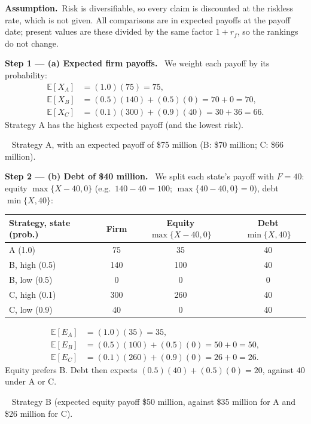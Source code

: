 \documentclass[11pt,a4paper]{article}
\newcommand{\step}[2]{\par\medskip\noindent\textbf{Step #1 --- #2.}~}
\newcommand{\assume}{\par\smallskip\noindent\textbf{Assumption.}~}
\newcommand{\answer}[1]{\par\smallskip\noindent\fbox{\textbf{Answer #1.}}~}
\begin{document}
\assume Risk is diversifiable, so every claim is discounted at the riskless rate, which is not
given. All comparisons are in expected payoffs at the payoff date; present values are these
divided by the same factor $1+r_f$, so the rankings do not change.

\step{1}{(a) Expected firm payoffs} We weight each payoff by its probability:
\begin{align}
  \mathbb{E}[X_A] &= (1.0)(75) = 75, \label{t4e6-XA}\\
  \mathbb{E}[X_B] &= (0.5)(140)+(0.5)(0) = 70+0 = 70, \label{t4e6-XB}\\
  \mathbb{E}[X_C] &= (0.1)(300)+(0.9)(40) = 30+36 = 66. \label{t4e6-XC}
\end{align}
Strategy A has the highest expected payoff (and the lowest risk).

\answer{(a)} Strategy A, with an expected payoff of \$75 million (B: \$70 million; C: \$66 million).

\step{2}{(b) Debt of \$40 million} We split each state's payoff with $F=40$: equity
$\max\{X-40,0\}$ (e.g.\ $140-40=100$; $\max\{40-40,0\}=0$), debt $\min\{X,40\}$:
\begin{center}
\begin{tabular}{lccc}
\toprule
Strategy, state (prob.) & Firm & Equity $\max\{X-40,0\}$ & Debt $\min\{X,40\}$\\
\midrule
A (1.0) & 75 & 35 & 40\\
B, high (0.5) & 140 & 100 & 40\\
B, low (0.5) & 0 & 0 & 0\\
C, high (0.1) & 300 & 260 & 40\\
C, low (0.9) & 40 & 0 & 40\\
\bottomrule
\end{tabular}
\end{center}
\begin{align}
  \mathbb{E}[E_A] &= (1.0)(35) = 35, \nonumber\\
  \mathbb{E}[E_B] &= (0.5)(100)+(0.5)(0) = 50+0 = 50, \label{t4e6-EB40}\\
  \mathbb{E}[E_C] &= (0.1)(260)+(0.9)(0) = 26+0 = 26. \nonumber
\end{align}
Equity prefers B. Debt then expects $(0.5)(40)+(0.5)(0)=20$, against $40$ under A or C.

\answer{(b)} Strategy B (expected equity payoff \$50 million, against \$35 million for A and
\$26 million for C).
\end{document}
